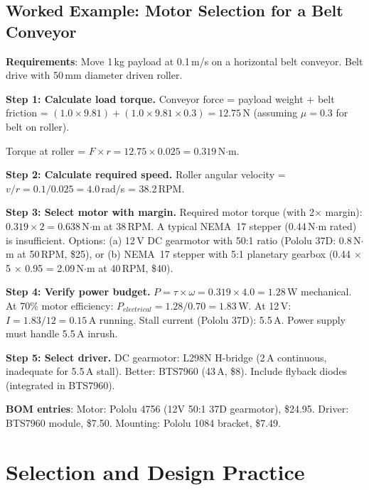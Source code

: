 
\subsection{Worked Example: Motor Selection for a Belt Conveyor}

\textbf{Requirements}: Move 1\,kg payload at 0.1\,m/s on a horizontal belt conveyor. Belt drive with 50\,mm diameter driven roller.

\textbf{Step 1: Calculate load torque.}
Conveyor force = payload weight + belt friction = $(1.0 \times 9.81) + (1.0 \times 9.81 \times 0.3) = 12.75$\,N (assuming $\mu = 0.3$ for belt on roller).

Torque at roller = $F \times r = 12.75 \times 0.025 = 0.319$\,N$\cdot$m.

\textbf{Step 2: Calculate required speed.}
Roller angular velocity = $v/r = 0.1/0.025 = 4.0$\,rad/s = 38.2\,RPM.

\textbf{Step 3: Select motor with margin.}
Required motor torque (with 2$\times$ margin): $0.319 \times 2 = 0.638$\,N$\cdot$m at 38\,RPM. A typical NEMA~17 stepper (0.44\,N$\cdot$m rated) is insufficient. Options: (a) 12\,V DC gearmotor with 50:1 ratio (Pololu 37D: 0.8\,N$\cdot$m at 50\,RPM, \$25), or (b) NEMA~17 stepper with 5:1 planetary gearbox (0.44 $\times$ 5 $\times$ 0.95 = 2.09\,N$\cdot$m at 40\,RPM, \$40).

\textbf{Step 4: Verify power budget.}
$P = \tau \times \omega = 0.319 \times 4.0 = 1.28$\,W mechanical. At 70\% motor efficiency: $P_{electrical} = 1.28/0.70 = 1.83$\,W. At 12\,V: $I = 1.83/12 = 0.15$\,A running. Stall current (Pololu 37D): 5.5\,A. Power supply must handle 5.5\,A inrush.

\textbf{Step 5: Select driver.}
DC gearmotor: L298N H-bridge (2\,A continuous, inadequate for 5.5\,A stall). Better: BTS7960 (43\,A, \$8). Include flyback diodes (integrated in BTS7960).

\textbf{BOM entries}: Motor: Pololu 4756 (12V 50:1 37D gearmotor), \$24.95. Driver: BTS7960 module, \$7.50. Mounting: Pololu 1084 bracket, \$7.49.

\section{Selection and Design Practice}

